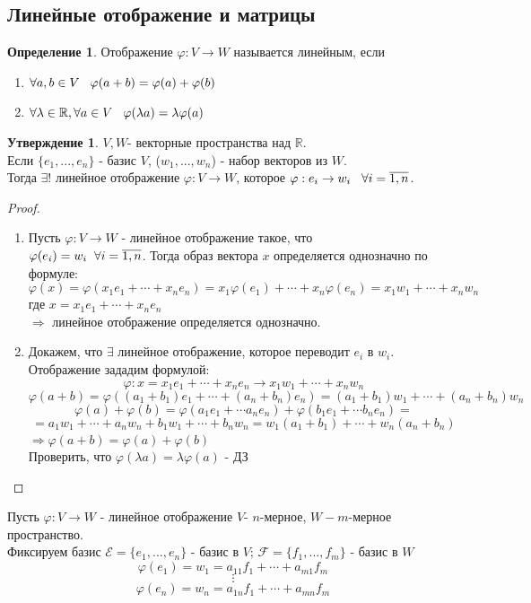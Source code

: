 \documentclass[a4paper, 12pt]{article}
\newcommand{\R}{\mathbb R}
\renewcommand{\phi}{\varphi}
\newcommand\tab[1][.5cm]{\hspace*{#1}}
\theoremstyle{definition}
\newtheorem*{definition}{Определение}
\newtheorem*{subtheorem}{Утверждение}
\begin{document}
  \subsection{Линейные отображение и матрицы}
  \begin{definition}
    Отображение $\phi: V \to W$ называется линейным, если
    \begin{enumerate}
      \item $\forall a,b \in V \tab[0.3cm] \phi(a+b) = \phi(a) + \phi(b)$
      \item $\forall \lambda \in \R, \forall a \in V \tab[0.3cm] \phi(\lambda a) = \lambda \phi(a)$  
    \end{enumerate}
    
  \end{definition} 
  \begin{subtheorem}
    $V,W$- векторные пространства над $\R$. \\
      Если $\{e_1,...,e_n\}$ - базис $V$, ($w_1,...,w_n$) - набор векторов из $W$. \\Тогда $\exists$! линейное отображение $\phi: V \to W$, которое $\phi: e_i \to w_i \tab[0.3cm]\forall i = \overline{1,n}$.
  \end{subtheorem} 

  \begin{proof} \tab
    \begin{enumerate}
      \item Пусть $\phi: V \to W$ - линейное отображение такое, что \\$\phi(e_i) = w_i \tab[0.2cm] \forall i = \overline{1,n}$. Тогда образ вектора $x$ определяется однозначно по формуле: $$\phi(x) = \phi(x_1e_1 + \cdots + x_ne_n) = x_1 \phi(e_1) + \cdots + x_n \phi(e_n) = x_1 w_1 + \cdots + x_n w_n$$ где $x=x_1e_1 + \cdots + x_ne_n$ \\
      $\Longrightarrow$ линейное отображение определяется однозначно.
      \item Докажем, что $\exists$ линейное отображение, которое переводит $e_i$ в $w_i$. Отображение зададим формулой: $$\phi: x = x_1e_1 + \cdots + x_ne_n \to x_1w_1 + \cdots + x_nw_n$$
      $$\phi(a+b) = \phi((a_1+b_1)e_1 + \cdots + (a_n + b_n)e_n) = (a_1+b_1)w_1 + \cdots + (a_n + b_n)w_n$$
      $$\phi(a) + \phi(b) = \phi(a_1e_1 + \cdots a_ne_n) + \phi(b_1e_1 + \cdots b_ne_n) = $$ $$= a_1w_1 + \cdots + a_nw_n + b_1w_1 + \cdots + b_nw_n = w_1(a_1 + b_1) + \cdots + w_n(a_n + b_n)$$
      $\Longrightarrow \phi(a+b) = \phi(a) + \phi(b)$\\
      Проверить, что $\phi(\lambda a) = \lambda \phi(a)$ - ДЗ
    \end{enumerate}
  \end{proof} 
  Пусть $\phi: V \to W$ - линейное отображение $V$- $n$-мерное, $W - m$-мерное пространство.  \\
  Фиксируем базис 
  $\mathcal{E}  = \{e_1,...,e_n\}$ - базис в $V$; $\mathcal{F}  = \{f_1,...,f_m\}$ - базис в $W$
  $$\phi(e_1) = w_1 = a_{11}f_1 + \cdots + a_{m1}f_m$$ $$\vdots$$
  $$\phi(e_n) = w_n = a_{1n}f_1 + \cdots + a_{mn}f_m$$
\end{document}
